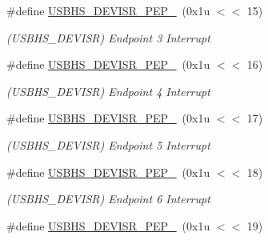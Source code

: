 \begin{DoxyCompactItemize}
\mbox{\label{group__SAMS70__USBHS_gaee2002bc42efc064ad362756f2e5a662}} 
\#define \mbox{\hyperlink{group__SAMS70__USBHS_gaee2002bc42efc064ad362756f2e5a662}{U\+S\+B\+H\+S\+\_\+\+D\+E\+V\+I\+S\+R\+\_\+\+P\+E\+P\+\_}}~(0x1u $<$$<$ 15)
\begin{DoxyCompactList}\small\item\em (U\+S\+B\+H\+S\+\_\+\+D\+E\+V\+I\+SR) Endpoint 3 Interrupt \end{DoxyCompactList}\item 
\mbox{\label{group__SAMS70__USBHS_gadb9cfdfcb42105fde79a159efd6d3175}} 
\#define \mbox{\hyperlink{group__SAMS70__USBHS_gadb9cfdfcb42105fde79a159efd6d3175}{U\+S\+B\+H\+S\+\_\+\+D\+E\+V\+I\+S\+R\+\_\+\+P\+E\+P\+\_}}~(0x1u $<$$<$ 16)
\begin{DoxyCompactList}\small\item\em (U\+S\+B\+H\+S\+\_\+\+D\+E\+V\+I\+SR) Endpoint 4 Interrupt \end{DoxyCompactList}\item 
\mbox{\label{group__SAMS70__USBHS_ga834ec84fbf0e965e4c8e6e042d75c50e}} 
\#define \mbox{\hyperlink{group__SAMS70__USBHS_ga834ec84fbf0e965e4c8e6e042d75c50e}{U\+S\+B\+H\+S\+\_\+\+D\+E\+V\+I\+S\+R\+\_\+\+P\+E\+P\+\_}}~(0x1u $<$$<$ 17)
\begin{DoxyCompactList}\small\item\em (U\+S\+B\+H\+S\+\_\+\+D\+E\+V\+I\+SR) Endpoint 5 Interrupt \end{DoxyCompactList}\item 
\mbox{\label{group__SAMS70__USBHS_gaf8ef950a363593c5700b3d0d62af4452}} 
\#define \mbox{\hyperlink{group__SAMS70__USBHS_gaf8ef950a363593c5700b3d0d62af4452}{U\+S\+B\+H\+S\+\_\+\+D\+E\+V\+I\+S\+R\+\_\+\+P\+E\+P\+\_}}~(0x1u $<$$<$ 18)
\begin{DoxyCompactList}\small\item\em (U\+S\+B\+H\+S\+\_\+\+D\+E\+V\+I\+SR) Endpoint 6 Interrupt \end{DoxyCompactList}\item 
\mbox{\label{group__SAMS70__USBHS_gac11cbbc5d94a2bd715d969843c88665e}} 
\#define \mbox{\hyperlink{group__SAMS70__USBHS_gac11cbbc5d94a2bd715d969843c88665e}{U\+S\+B\+H\+S\+\_\+\+D\+E\+V\+I\+S\+R\+\_\+\+P\+E\+P\+\_}}~(0x1u $<$$<$ 19)
$$
\end{DoxyCompactItemize}
